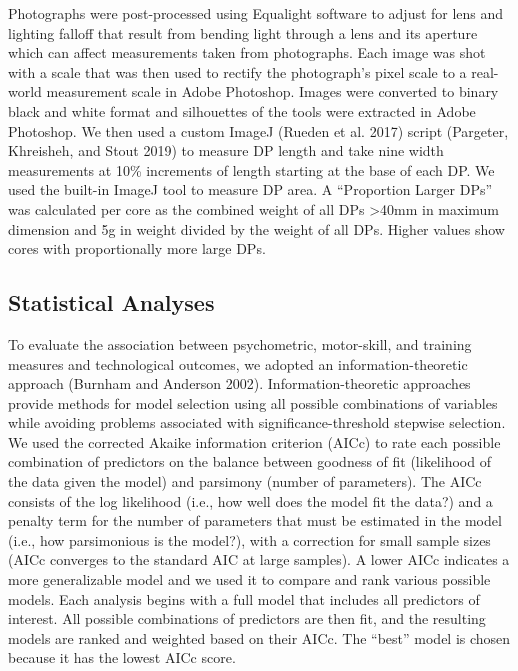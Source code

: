 \documentclass[smallextended]{svjour3}       %
\begin{document}
Photographs were post-processed using Equalight software to adjust for
lens and lighting falloff that result from bending light through a lens
and its aperture which can affect measurements taken from photographs.
Each image was shot with a scale that was then used to rectify the
photograph's pixel scale to a real-world measurement scale in Adobe
Photoshop. Images were converted to binary black and white format and
silhouettes of the tools were extracted in Adobe Photoshop. We then used
a custom ImageJ (Rueden et al. 2017) script (Pargeter, Khreisheh, and
Stout 2019) to measure DP length and take nine width measurements at
10\% increments of length starting at the base of each DP. We used the
built-in ImageJ tool to measure DP area. A ``Proportion Larger DPs'' was
calculated per core as the combined weight of all DPs \textgreater40mm
in maximum dimension and 5g in weight divided by the weight of all DPs.
Higher values show cores with proportionally more large DPs.

\hypertarget{statistical-analyses}{%
\subsection{\texorpdfstring{\textbf{Statistical
Analyses}}{Statistical Analyses}}\label{statistical-analyses}}

To evaluate the association between psychometric, motor-skill, and
training measures and technological outcomes, we adopted an
information-theoretic approach (Burnham and Anderson 2002).
Information-theoretic approaches provide methods for model selection
using all possible combinations of variables while avoiding problems
associated with significance-threshold stepwise selection. We used the
corrected Akaike information criterion (AICc) to rate each possible
combination of predictors on the balance between goodness of fit
(likelihood of the data given the model) and parsimony (number of
parameters). The AICc consists of the log likelihood (i.e., how well
does the model fit the data?) and a penalty term for the number of
parameters that must be estimated in the model (i.e., how parsimonious
is the model?), with a correction for small sample sizes (AICc converges
to the standard AIC at large samples). A lower AICc indicates a more
generalizable model and we used it to compare and rank various possible
models. Each analysis begins with a full model that includes all
predictors of interest. All possible combinations of predictors are then
fit, and the resulting models are ranked and weighted based on their
AICc. The ``best'' model is chosen because it has the lowest AICc score.
\end{document}
